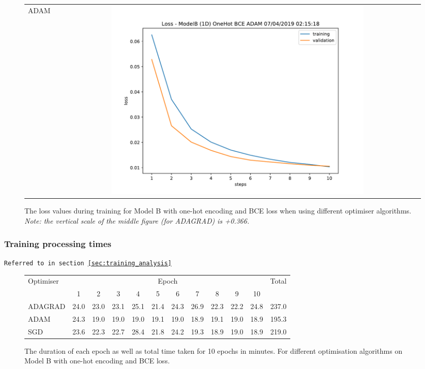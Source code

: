 \begin{appendices}
\begin{figure}[H]
\begin{tabular}{l|c|}
                \hline
                ADAM & \includegraphics[width=0.7\textwidth,height=0.22\textheight,keepaspectratio]{figures/training_plots/ModelB-(1D)-OneHot-BCE-ADAM_07-04-2019_02-15-18_loss.pdf} 
            \end{tabular}
            \caption*{The loss values during training for Model B with one-hot encoding and BCE loss when using different optimiser algorithms. \textit{Note: the vertical scale of the middle figure (for ADAGRAD) is +0.366.}}
        \end{figure}
        
        \subsubsection{Training processing times}
        \label{app:optimisation_processing_times}
        \texttt{Referred to in section \ref{sec:training_analysis}}
        
        \begin{figure}[H]
            \centering
            \begin{tabular}{l|c|c|c|c|c|c|c|c|c|c|c|}
                \multirow{2}{*}{Optimiser} & \multicolumn{10}{c|}{Epoch} & \multirow{2}{*}{Total}\\
                    \cline{2-11}
                    & 1 & 2 & 3 & 4 & 5 & 6 & 7 & 8 & 9 & 10 &\\
                    \hline
                ADAGRAD & 24.0 & 23.0 & 23.1 & 25.1 & 21.4 & 24.3 & 26.9 & 22.3 & 22.2 & 24.8 & 237.0\\
                ADAM & 24.3 & 19.0 & 19.0 & 19.0 & 19.1 & 19.0 & 18.9 & 19.1 & 19.0 & 18.9 & 195.3\\
                SGD & 23.6 & 22.3 & 22.7 & 28.4 & 21.8 & 24.2 & 19.3 & 18.9 & 19.0 & 18.9 & 219.0
            \end{tabular}
            \caption*{The duration of each epoch as well as total time taken for 10 epochs in minutes. For different optimisation algorithms on Model B with one-hot encoding and BCE loss.}
        \end{figure}
        

\end{appendices}
